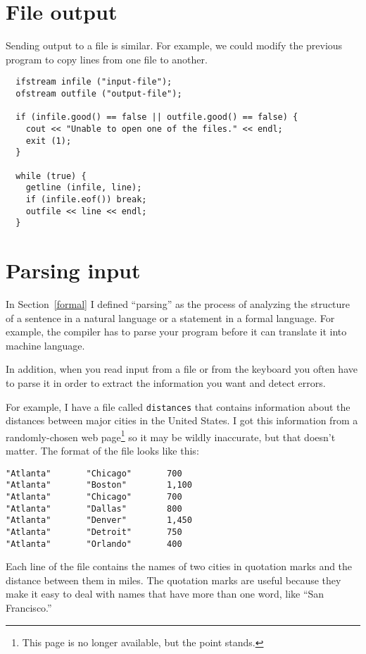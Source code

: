 \section{File output}

Sending output to a file is similar.  For example, we could
modify the previous program to copy lines from one file to
another.

\begin{verbatim}
  ifstream infile ("input-file");
  ofstream outfile ("output-file");

  if (infile.good() == false || outfile.good() == false) {
    cout << "Unable to open one of the files." << endl;
    exit (1);
  }

  while (true) {
    getline (infile, line);
    if (infile.eof()) break;
    outfile << line << endl;
  }
\end{verbatim}

\section{Parsing input}
\label{parsing}

In Section~\ref{formal} I defined ``parsing'' as the process of
analyzing the structure of a sentence in a natural language or a
statement in a formal language.  For example, the compiler has to
parse your program before it can translate it into machine language.

In addition, when you read input from a file or from the keyboard
you often have to parse it in order to extract the information
you want and detect errors.

For example, I have a file called {\tt distances} that contains
information about the distances between major cities in the
United States.  I got this information from a randomly-chosen
web page\footnote{This page is no longer available, but the point stands.}
so it may be wildly inaccurate, but that doesn't matter.  The
format of the file looks like this:

\begin{verbatim}
"Atlanta"       "Chicago"       700
"Atlanta"       "Boston"        1,100
"Atlanta"       "Chicago"       700
"Atlanta"       "Dallas"        800
"Atlanta"       "Denver"        1,450
"Atlanta"       "Detroit"       750
"Atlanta"       "Orlando"       400
\end{verbatim}
%
Each line of the file contains the names of two cities in quotation
marks and the distance between them in miles.  The quotation marks
are useful because they make it easy to deal with names that have
more than one word, like ``San Francisco.''


